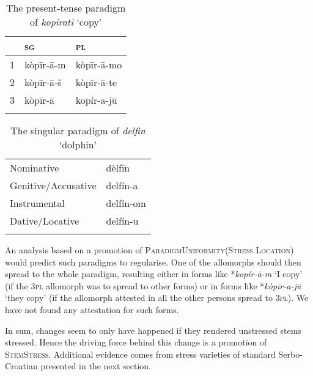 \documentclass[output=paper,modfonts,nonflat
]{langsci/langscibook}
\begin{document}
\begin{table}
\caption{The present-tense paradigm of \textit{kopirati} `copy'}
\label{tab:kager:8}
\begin{tabular}{ l l l }
  \lsptoprule
& \textsc{sg}  & \textsc{pl}\\ 
 \midrule
 1  &  kòpīr-ā-m  &   kòpīr-ā-mo \\
2  &  kòpīr-ā-š  & kòpīr-ā-te \\
3  &  kòpīr-ā & kopír-a-jū \\
  \lspbottomrule
 \end{tabular}
\end{table}

\begin{table}
\caption{The singular paradigm of \textit{delfin} `dolphin'}
\label{tab:kager:9}
 \begin{tabular}{   l l }
    \lsptoprule
 Nominative  & dèlfīn  \\
Genitive/Accusative  & delfín-a \\
Instrumental   &  delfín-om \\
Dative/Locative   &  delfín-u \\
\lspbottomrule
 \end{tabular}
\end{table}
	
An analysis based on a promotion of \textsc{ParadigmUniformity(Stress Location)} would predict such paradigms to regularise. One of the allomorphs should then spread to the whole paradigm, resulting either in forms like *\textit{kopír-ā-m} `I copy' (if the 3\textsc{pl} allomorph was to spread to other forms) or in forms like *\textit{kòpīr-a-jū} `they copy' (if the allomorph attested in all the other persons spread to 3\textsc{pl}). We have not found any attestation for such forms. 

In sum, changes seem to only have happened if they rendered unstressed stems stressed. Hence the driving force behind this change is a promotion of \textsc{StemStress}. Additional evidence comes from stress varieties of standard Serbo-Croatian presented in the next section.
\end{document}
